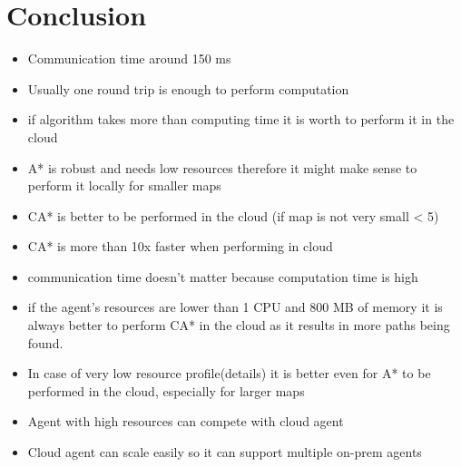 \chapter{Conclusion}
\begin{itemize}
    \item Communication time around 150 ms
    \item Usually one round trip is enough to perform computation
    \item if algorithm takes more than computing time it is worth to perform it in the cloud
    \item A* is robust and needs low resources therefore it might make sense to perform it locally for smaller maps
    \item CA* is better to be performed in the cloud (if map is not very small < 5)
    \item CA* is more than 10x faster when performing in cloud
    \item communication time doesn't matter because computation time is high
    \item if the agent's resources are lower than 1 CPU and 800 MB of memory it is always better to perform CA* in the cloud as it results in more paths being found.
    \item In case of very low resource profile(details) it is better even for A* to be performed in the cloud, especially for larger maps
    \item Agent with high resources can compete with cloud agent
    \item Cloud agent can scale easily so it can support multiple on-prem agents
\end{itemize}